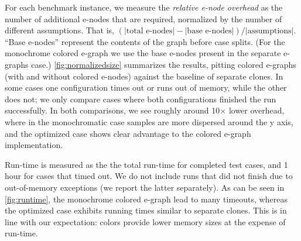For each benchmark instance, we measure the \emph{relative e-node overhead} as the number of additional e-nodes that are required, normalized by the number of different assumptions.
That is, $(|\textrm{total e-nodes}| - |\textrm{base e-nodes}|) / |\textrm{assumptions}|$.
``Base e-nodes'' represent the contents of the graph before case splits.
(For the monochrome colored e-graph we use the base e-nodes present in the separate e-graphs case.)
\autoref{fig:normalizedsize} summarizes the results, pitting colored e-graphs (with and without colored e-nodes) against the baseline of separate clones.
In some cases one configuration times out or runs out of memory, while the other does not;
we only compare cases where both configurations finished the run successfully.
In both comparisons, we see roughly around 10$\times$ lower overhead, where in the monochromatic case samples are more dispersed around the y axis, and the optimized case shows clear advantage to the colored e-graph implementation.


Run-time is measured as the the total run-time for completed test cases, and 1 hour for cases that timed out.
We do not include runs that did not finish due to out-of-memory exceptions (we report the latter separately).
As can be seen in \autoref{fig:runtime}, the monochrome colored e-graph lead to many timeouts,
whereas the optimized case exhibits running times similar to separate clones.
This is in line with our expectation:
colors provide lower memory sizes at the expense of run-time.

